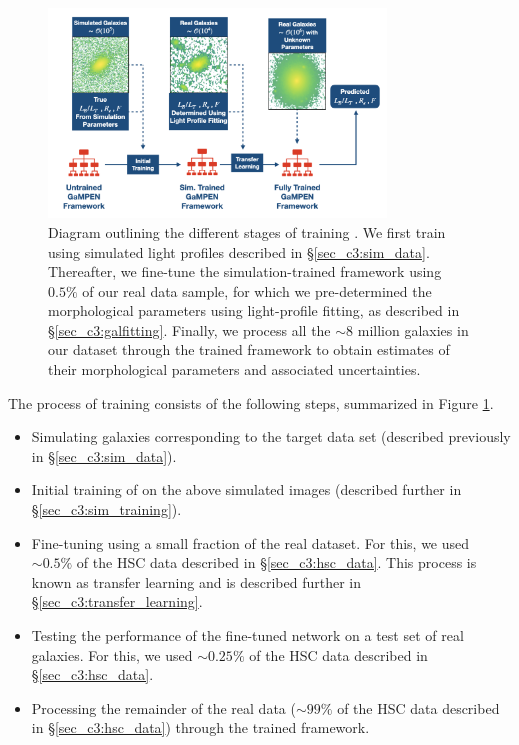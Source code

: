 \begin{figure}[htb]
    \centering
    \includegraphics[width
    =0.8\textwidth]{full_gampen_workflow.png}
    \caption{Diagram outlining the different stages of training \gampen{}. We first train \gampen{} using simulated light profiles described in \S \ref{sec_c3:sim_data}. Thereafter, we fine-tune the simulation-trained framework using $0.5\%$ of our real data sample, for which we pre-determined the morphological parameters using light-profile fitting, as described in \S \ref{sec_c3:galfitting}. Finally, we process all the $\sim 8$ million galaxies in our dataset through the trained \gampen{} framework to obtain estimates of their morphological parameters and associated uncertainties.}
    \label{fig_c3:full_gampen_workflow}
\end{figure}

The process of training \gampen{} consists of the following steps, summarized in Figure \ref{fig_c3:full_gampen_workflow}.
\begin{itemize}
\item Simulating galaxies corresponding to the target data set (described previously in \S \ref{sec_c3:sim_data}).
\item Initial training of \gampen{} on the above simulated images (described further in \S \ref{sec_c3:sim_training}).
\item Fine-tuning \gampen{} using a small fraction of the real dataset. For this, we used $\sim0.5\%$ of the HSC data described in \S \ref{sec_c3:hsc_data}. This process is known as transfer learning and is described further in \S \ref{sec_c3:transfer_learning}.
\item Testing the performance of the fine-tuned network on a test set of real galaxies. For this, we used $\sim0.25\%$ of the HSC data described in \S \ref{sec_c3:hsc_data}.
\item Processing the remainder of the real data ($\sim99\%$ of the HSC data described in \S \ref{sec_c3:hsc_data}) through the trained framework.
\end{itemize}

